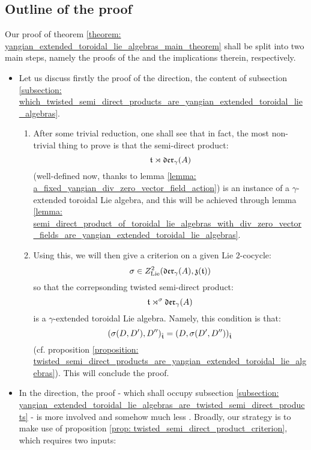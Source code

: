     \subsection{Outline of the proof}
        Our proof of theorem \ref{theorem: yangian_extended_toroidal_lie_algebras_main_theorem} shall be split into two main steps, namely the proofs of the  and the  implications therein, respectively.
        \begin{itemize}
            \item Let us discuss firstly the proof of the  direction, the content of subsection \ref{subsection: which_twisted_semi_direct_products_are_yangian_extended_toroidal_lie_algebras}.
            \begin{enumerate}
                \item After some trivial reduction, one shall see that in fact, the most non-trivial thing to prove is that the semi-direct product:
                    $$\mathfrak{t} \rtimes \mathfrak{der}_{\gamma}(A)$$
                (well-defined now, thanks to lemma \ref{lemma: a_fixed_yangian_div_zero_vector_field_action}) is an instance of a $\gamma$-extended toroidal Lie algebra, and this will be achieved through lemma \ref{lemma: semi_direct_product_of_toroidal_lie_algebras_with_div_zero_vector_fields_are_yangian_extended_toroidal_lie_algebras}. \item Using this, we will then give a criterion on a given Lie $2$-cocycle:
                    $$\sigma \in Z^2_{\mathrm{Lie}}(\mathfrak{der}_{\gamma}(A), \mathfrak{z}(\mathfrak{t}))$$
                so that the correpsonding twisted semi-direct product:
                    $$\mathfrak{t} \rtimes^{\sigma} \mathfrak{der}_{\gamma}(A)$$
                is a $\gamma$-extended toroidal Lie algebra. Namely, this condition is that:
                    $$( \sigma(D, D'), D'' )_{\hat{\mathfrak{t}}} = ( D, \sigma(D', D'') )_{\hat{\mathfrak{t}}}$$
                (cf. proposition \ref{proposition: twisted_semi_direct_products_are_yangian_extended_toroidal_lie_algebras}). This will conclude the proof.
            \end{enumerate}
            \item In the  direction, the proof - which shall occupy subsection \ref{subsection: yangian_extended_toroidal_lie_algebras_are_twisted_semi_direct_products} - is more involved and somehow much less . Broadly, our strategy is to make use of proposition \ref{prop: twisted_semi_direct_product_criterion}, which requires two inputs:
            \begin{itemize}

\end{itemize}
\end{itemize}
